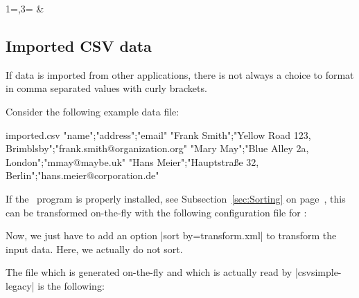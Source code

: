 \documentclass[a4paper,11pt]{ltxdoc}
\begin{document}
\begin{dispExample}
  {1=\land,3=\amount}
  {\land & \amount}
\end{dispExample}


\clearpage
\subsection{Imported CSV data}\label{sec:importeddata}%
If data is imported from other applications, there is not always a choice
to format in comma separated values with curly brackets.

Consider the following example data file:

\begin{tcbverbatimwrite}{imported.csv}
"name";"address";"email"
"Frank Smith";"Yellow Road 123, Brimblsby";"frank.smith@organization.org"
"Mary May";"Blue Alley 2a, London";"mmay@maybe.uk"
"Hans Meier";"Hauptstraße 32, Berlin";"hans.meier@corporation.de"
\end{tcbverbatimwrite}


If the \csvsorter\ program is properly installed,
see Subsection~\ref{sec:Sorting} on page~\pageref{sec:Sorting},
this can be transformed on-the-fly
with the following configuration file for \csvsorter:


Now, we just have to add an option |sort by=transform.xml| to transform
the input data. Here, we actually do not sort.

\begin{dispExample}
\newcommand{\Header}[1]{\normalfont\bfseries #1}

\csvreader[
  sort by=transform.xml,
  tabular=>{\itshape}ll>{\ttfamily}l,
  table head=\toprule\Header{Name} & \Header{Address} & \Header{email}\\\midrule,
  table foot=\bottomrule]
  {imported.csv}{}{\csvlinetotablerow}
\end{dispExample}

The file which is generated on-the-fly and which is actually read by
|csvsimple-legacy| is the following:

\end{document}
